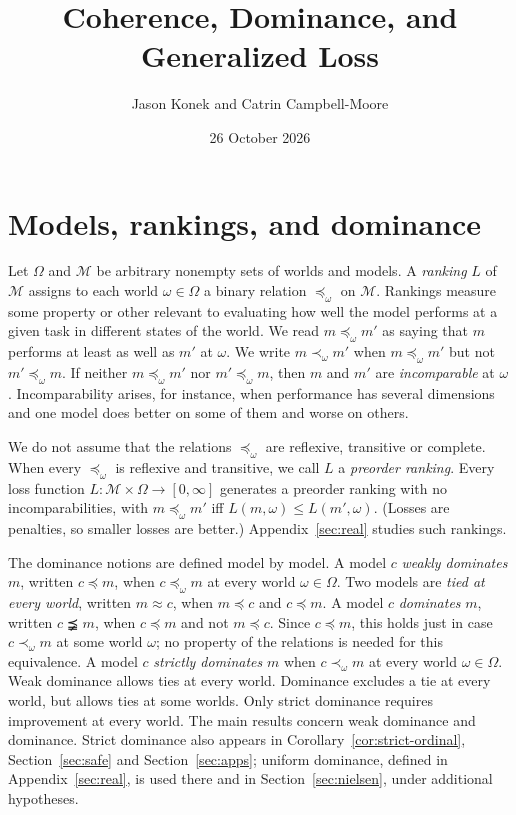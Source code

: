 \documentclass[11pt]{article}
\title{Coherence, Dominance, and Generalized Loss}
\author{Jason Konek and Catrin Campbell-Moore}
\date{26 October 2026}
\theoremstyle{definition}
\theoremstyle{remark}
\newcommand{\M}{\mathcal M}
\begin{document}
\maketitle

\section{Models, rankings, and dominance}\label{sec:setting}
Let $\Omega$ and $\M$ be arbitrary nonempty sets of worlds and models. A \emph{ranking} $L$ of $\M$ assigns to each world $\omega\in\Omega$ a binary relation $\preceq_\omega$ on $\M$. Rankings measure some property or other relevant to evaluating how well the model performs at a given task in different states of the world. We read $m\preceq_\omega m'$ as saying that $m$ performs at least as well as $m'$ at $\omega$. We write $m\prec_\omega m'$ when $m\preceq_\omega m'$ but not $m'\preceq_\omega m$. If neither $m\preceq_\omega m'$ nor $m'\preceq_\omega m$, then $m$ and $m'$ are \emph{incomparable} at $\omega$. Incomparability arises, for instance, when performance has several dimensions and one model does better on some of them and worse on others.

We do not assume that the relations $\preceq_\omega$ are reflexive, transitive or complete. When every $\preceq_\omega$ is reflexive and transitive, we call $L$ a \emph{preorder ranking}. Every loss function $L:\M\times\Omega\to[0,\infty]$ generates a preorder ranking with no incomparabilities, with $m\preceq_\omega m'$ iff $L(m,\omega)\le L(m',\omega)$. (Losses are penalties, so smaller losses are better.) Appendix~\ref{sec:real} studies such rankings.

The dominance notions are defined model by model. A model $c$ \emph{weakly dominates} $m$, written $c\preceq m$, when $c\preceq_\omega m$ at every world $\omega\in\Omega$. Two models are \emph{tied at every world}, written $m\approx c$, when $m\preceq c$ and $c\preceq m$. A model $c$ \emph{dominates} $m$, written $c\precneqq m$, when $c\preceq m$ and not $m\preceq c$. Since $c\preceq m$, this holds just in case $c\prec_\omega m$ at some world $\omega$; no property of the relations is needed for this equivalence. A model $c$ \emph{strictly dominates} $m$ when $c\prec_\omega m$ at every world $\omega\in\Omega$. Weak dominance allows ties at every world. Dominance excludes a tie at every world, but allows ties at some worlds. Only strict dominance requires improvement at every world. The main results concern weak dominance and dominance. Strict dominance also appears in Corollary~\ref{cor:strict-ordinal}, Section~\ref{sec:safe} and Section~\ref{sec:apps}; uniform dominance, defined in Appendix~\ref{sec:real}, is used there and in Section~\ref{sec:nielsen}, under additional hypotheses.
\end{document}
